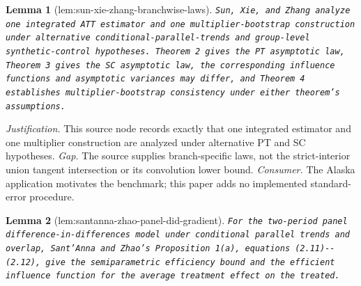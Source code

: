 \documentclass{article}
\newtheorem{lemma}{Lemma}
\begin{document}
\begin{lemma}[lem:sun-xie-zhang-branchwise-laws]\label{lem:sun-xie-zhang-branchwise-laws}
\texttt{Sun,\allowbreak{} Xie,\allowbreak{} and Zhang analyze one integrated ATT estimator and one multiplier-\allowbreak{}bootstrap construction under alternative conditional-\allowbreak{}parallel-\allowbreak{}trends and group-\allowbreak{}level synthetic-\allowbreak{}control hypotheses. Theorem 2 gives the PT asymptotic law,\allowbreak{} Theorem 3 gives the SC asymptotic law,\allowbreak{} the corresponding influence functions and asymptotic variances may differ,\allowbreak{} and Theorem 4 establishes multiplier-\allowbreak{}bootstrap consistency under either theorem's assumptions.}
\end{lemma}
\par\smallskip\noindent \textit{Justification.} This source node records exactly that one integrated estimator and one multiplier construction are analyzed under alternative PT and SC hypotheses. \textit{Gap.} The source supplies branch-specific laws, not the strict-interior union tangent intersection or its convolution lower bound. \textit{Consumer.} The Alaska application motivates the benchmark; this paper adds no implemented standard-error procedure.

\begin{lemma}[lem:santanna-zhao-panel-did-gradient]\label{lem:santanna-zhao-panel-did-gradient}
\texttt{For the two-\allowbreak{}period panel difference-\allowbreak{}in-\allowbreak{}differences model under conditional parallel trends and overlap,\allowbreak{} Sant'Anna and Zhao's Proposition 1(a),\allowbreak{} equations (2.11)-\allowbreak{}-\allowbreak{}(2.12),\allowbreak{} give the semiparametric efficiency bound and the efficient influence function for the average treatment effect on the treated.}
\end{lemma}
\end{document}
